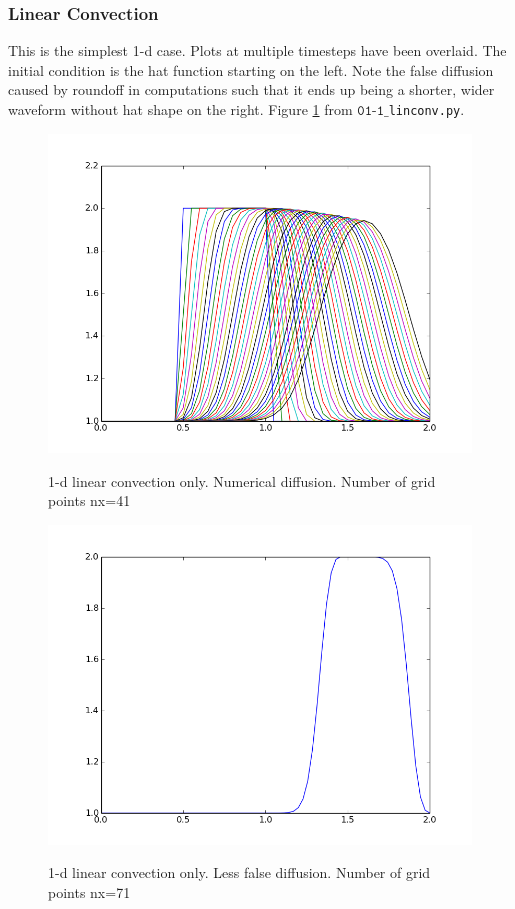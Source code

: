 \documentclass[11pt]{article}
\begin{document}
{\subsubsection{Linear Convection}\label{cfl+friends}
This is the simplest 1-d case. Plots at multiple timesteps have been overlaid.
The initial condition is the hat function starting on the left.
Note the false diffusion caused by roundoff in computations such that it ends up being a
shorter, wider waveform without hat shape on the right. Figure \ref{fig:num_diff} from
$\texttt{01-1\_}$\texttt{linconv.py}.

	\begin{figure}[num_diff]
	\centering
	\caption{1-d linear convection only. Numerical diffusion. Number of grid points nx=41}
	\includegraphics[scale=0.8]{num_diff.png}
	\label{fig:num_diff}
	\end{figure}

	\begin{figure}[num_diff_fine_mesh]
	\centering
	\caption{1-d linear convection only. Less false diffusion. Number of grid points nx=71}
	\includegraphics[scale=0.8]{better_hat.png}
	\label{fig:num_diff_fine_mesh}
	\end{figure}

}
\end{document}
